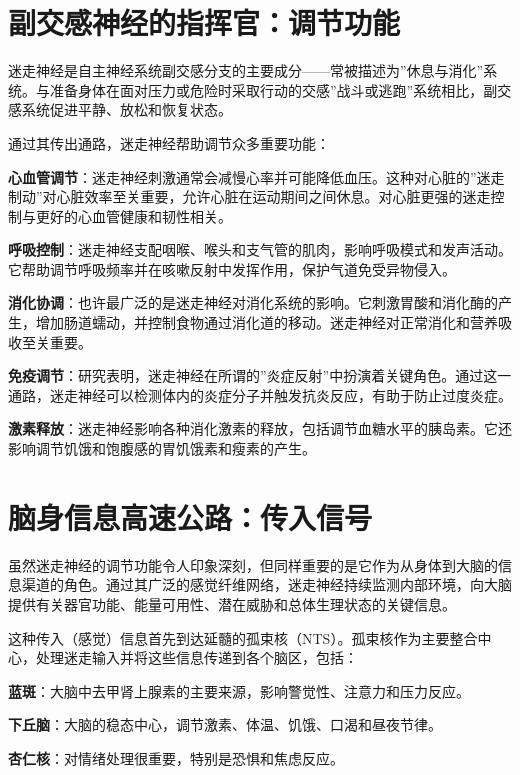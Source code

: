 \documentclass[
  Letterpaper,
]{scrbook}
\begin{document}
\section{副交感神经的指挥官：调节功能}\label{ux526fux4ea4ux611fux795eux7ecfux7684ux6307ux6325ux5b98ux8c03ux8282ux529fux80fd}

迷走神经是自主神经系统副交感分支的主要成分------常被描述为''休息与消化''系统。与准备身体在面对压力或危险时采取行动的交感''战斗或逃跑''系统相比，副交感系统促进平静、放松和恢复状态。

通过其传出通路，迷走神经帮助调节众多重要功能：

\textbf{心血管调节}：迷走神经刺激通常会减慢心率并可能降低血压。这种对心脏的''迷走制动''对心脏效率至关重要，允许心脏在运动期间之间休息。对心脏更强的迷走控制与更好的心血管健康和韧性相关。

\textbf{呼吸控制}：迷走神经支配咽喉、喉头和支气管的肌肉，影响呼吸模式和发声活动。它帮助调节呼吸频率并在咳嗽反射中发挥作用，保护气道免受异物侵入。

\textbf{消化协调}：也许最广泛的是迷走神经对消化系统的影响。它刺激胃酸和消化酶的产生，增加肠道蠕动，并控制食物通过消化道的移动。迷走神经对正常消化和营养吸收至关重要。

\textbf{免疫调节}：研究表明，迷走神经在所谓的''炎症反射''中扮演着关键角色。通过这一通路，迷走神经可以检测体内的炎症分子并触发抗炎反应，有助于防止过度炎症。

\textbf{激素释放}：迷走神经影响各种消化激素的释放，包括调节血糖水平的胰岛素。它还影响调节饥饿和饱腹感的胃饥饿素和瘦素的产生。

\section{脑身信息高速公路：传入信号}\label{ux8111ux8eabux4fe1ux606fux9ad8ux901fux516cux8defux4f20ux5165ux4fe1ux53f7}

虽然迷走神经的调节功能令人印象深刻，但同样重要的是它作为从身体到大脑的信息渠道的角色。通过其广泛的感觉纤维网络，迷走神经持续监测内部环境，向大脑提供有关器官功能、能量可用性、潜在威胁和总体生理状态的关键信息。

这种传入（感觉）信息首先到达延髓的孤束核（NTS）。孤束核作为主要整合中心，处理迷走输入并将这些信息传递到各个脑区，包括：

\textbf{蓝斑}：大脑中去甲肾上腺素的主要来源，影响警觉性、注意力和压力反应。

\textbf{下丘脑}：大脑的稳态中心，调节激素、体温、饥饿、口渴和昼夜节律。

\textbf{杏仁核}：对情绪处理很重要，特别是恐惧和焦虑反应。
\end{document}
